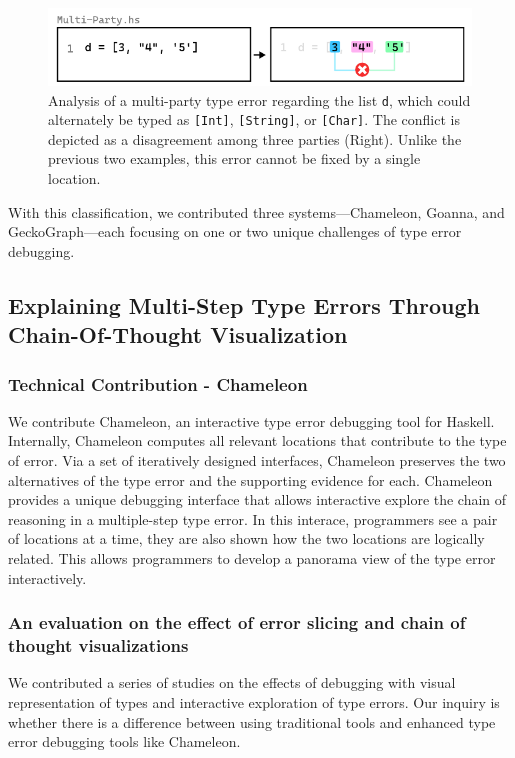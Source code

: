 \begin{figure}[hbt]
  \includegraphics[width=\linewidth]{Multi-Party}
  \caption{
    \label{fig:multi-party-example}
    Analysis of a multi-party type error regarding the list \texttt{d}, which could alternately be typed as \texttt{[Int]}, \texttt{[String]}, or \texttt{[Char]}. The conflict is depicted as a disagreement among three parties (Right). Unlike the previous two examples, this error cannot be fixed by a single location. }
\end{figure}

With this classification, we contributed three systems—Chameleon, Goanna, and GeckoGraph—each focusing on one or two unique challenges of type error debugging.

\subsection{Explaining Multi-Step Type Errors Through Chain-Of-Thought Visualization}

\subsubsection{Technical Contribution - Chameleon}
We contribute Chameleon, an interactive type error debugging tool for Haskell. Internally, Chameleon computes all relevant locations that contribute to the type of error. Via a set of iteratively designed interfaces, Chameleon preserves the two alternatives of the type error and the supporting evidence for each. Chameleon provides a unique debugging interface that allows interactive explore the chain of reasoning in a multiple-step type error. In this interace, programmers see a pair of locations at a time, they are also shown how the two locations are logically related. This allows programmers to develop a panorama view of the type error interactively. 

\subsubsection{An evaluation on the effect of error slicing and chain of thought visualizations}
We contributed a series of studies on the effects of debugging with visual representation of types and interactive exploration of type errors. Our inquiry is whether there is a difference between using traditional tools and enhanced type error debugging tools like Chameleon. 

